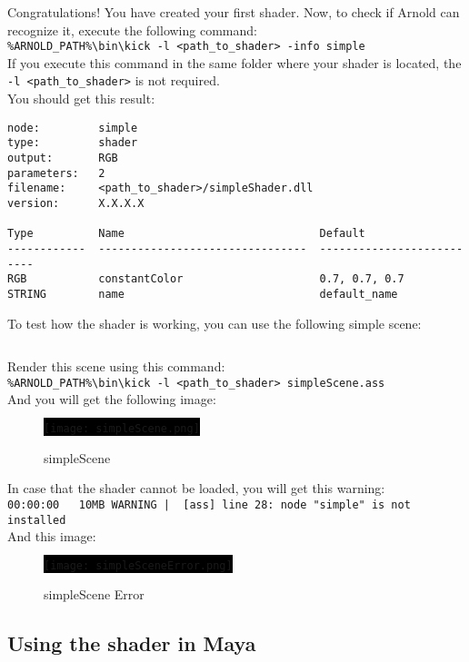 Congratulations! You have created your first shader. Now, to check if Arnold can recognize it, execute the following command:\\
\verb|%ARNOLD_PATH%\bin\kick -l <path_to_shader> -info simple|\\
If you execute this command in the same folder where your shader is located, the \verb|-l <path_to_shader>| is not required.\\

You should get this result:
{\footnotesize \begin{verbatim}
node:         simple
type:         shader
output:       RGB
parameters:   2
filename:     <path_to_shader>/simpleShader.dll
version:      X.X.X.X

Type          Name                              Default
------------  --------------------------------  --------------------------
RGB           constantColor                     0.7, 0.7, 0.7
STRING        name                              default_name
\end{verbatim}}


To test how the shader is working, you can use the following simple scene:

\inputminted[mathescape,
linenos,
numbersep=5pt,
frame=lines,
framesep=2mm,
baselinestretch=1,
fontsize=\footnotesize,
tabsize=3,
label=simpleScene.ass]
{ass}{simpleScene.ass}

Render this scene using this command:\\
\verb|%ARNOLD_PATH%\bin\kick -l <path_to_shader> simpleScene.ass|\\

And you will get the following image:
\begin{figure}[H]
\centering
\colorbox{black}{\texttt{[image: simpleScene.png]}}
\caption{simpleScene}
\label{simpleScene.png}
\end{figure}

In case that the shader cannot be loaded, you will get this warning:\\
{\footnotesize \verb=00:00:00   10MB WARNING |  [ass] line 28: node "simple" is not installed=}\\
And this image:
\begin{figure}[H]
\centering
\colorbox{black}{\texttt{[image: simpleSceneError.png]}}
\caption{simpleScene Error}
\label{simpleSceneError.png}
\end{figure}

\subsection{Using the shader in Maya}
